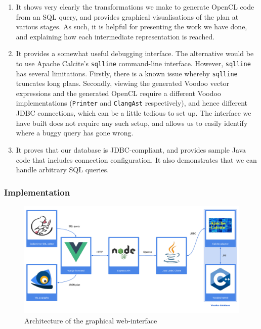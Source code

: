 \begin{enumerate}
\item It shows very clearly the transformations we make to generate OpenCL code from an SQL query, and provides graphical visualisations of the plan at various stages. As such, it is helpful for presenting the work we have done, and explaining how each intermediate representation is reached.
\item It provides a somewhat useful debugging interface. The alternative would be to use Apache Calcite's \texttt{sqlline} command-line interface. However, \texttt{sqlline} has several limitations. Firstly, there is a known issue whereby \texttt{sqlline} truncates long plans. Secondly, viewing the generated Voodoo vector expressions and the generated OpenCL require a different Voodoo implementations (\texttt{Printer} and \texttt{ClangAst} respectively), and hence different JDBC connections, which can be a little tedious to set up. The interface we have built does not require any such setup, and allows us to easily identify where a buggy query has gone wrong.
\item It proves that our database is JDBC-compliant, and provides sample Java code that includes connection configuration. It also demonstrates that we can handle arbitrary SQL queries.
\end{enumerate}

\subsubsection{Implementation}

\begin{figure}[H]
\includegraphics[width=\textwidth]{design-and-implementation/web-interface.pdf}
\centering
\caption{Architecture of the graphical web-interface}
\label{fig:web-interface}
\end{figure}

